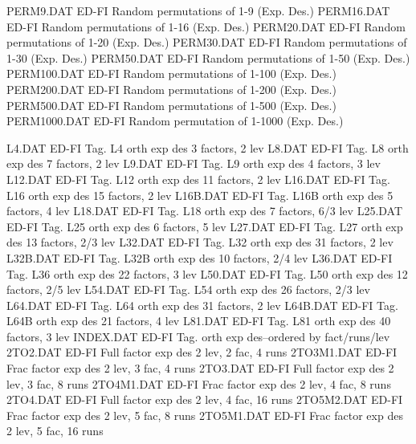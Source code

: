 PERM9.DAT                   ED-FI Random permutations of 1-9    (Exp. Des.)
PERM16.DAT                  ED-FI Random permutations of 1-16   (Exp. Des.)
PERM20.DAT                  ED-FI Random permutations of 1-20   (Exp. Des.)
PERM30.DAT                  ED-FI Random permutations of 1-30   (Exp. Des.)
PERM50.DAT                  ED-FI Random permutations of 1-50   (Exp. Des.)
PERM100.DAT                 ED-FI Random permutations of 1-100  (Exp. Des.)
PERM200.DAT                 ED-FI Random permutations of 1-200  (Exp. Des.)
PERM500.DAT                 ED-FI Random permutations of 1-500  (Exp. Des.)
PERM1000.DAT                ED-FI Random permutation  of 1-1000 (Exp. Des.)

L4.DAT                      ED-FI Tag. L4   orth exp des  3 factors,   2 lev
L8.DAT                      ED-FI Tag. L8   orth exp des  7 factors,   2 lev
L9.DAT                      ED-FI Tag. L9   orth exp des  4 factors,   3 lev
L12.DAT                     ED-FI Tag. L12  orth exp des 11 factors,   2 lev
L16.DAT                     ED-FI Tag. L16  orth exp des 15 factors,   2 lev
L16B.DAT                    ED-FI Tag. L16B orth exp des  5 factors,   4 lev
L18.DAT                     ED-FI Tag. L18  orth exp des  7 factors, 6/3 lev
L25.DAT                     ED-FI Tag. L25  orth exp des  6 factors,   5 lev
L27.DAT                     ED-FI Tag. L27  orth exp des 13 factors, 2/3 lev
L32.DAT                     ED-FI Tag. L32  orth exp des 31 factors,   2 lev
L32B.DAT                    ED-FI Tag. L32B orth exp des 10 factors, 2/4 lev
L36.DAT                     ED-FI Tag. L36  orth exp des 22 factors,   3 lev
L50.DAT                     ED-FI Tag. L50  orth exp des 12 factors, 2/5 lev
L54.DAT                     ED-FI Tag. L54  orth exp des 26 factors, 2/3 lev
L64.DAT                     ED-FI Tag. L64  orth exp des 31 factors,   2 lev
L64B.DAT                    ED-FI Tag. L64B orth exp des 21 factors,   4 lev
L81.DAT                     ED-FI Tag. L81  orth exp des 40 factors,   3 lev
INDEX.DAT                   ED-FI Tag. orth exp des--ordered by fact/runs/lev
2TO2.DAT                    ED-FI Full factor exp des 2 lev,  2 fac,   4 runs
2TO3M1.DAT                  ED-FI Frac factor exp des 2 lev,  3 fac,   4 runs
2TO3.DAT                    ED-FI Full factor exp des 2 lev,  3 fac,   8 runs
2TO4M1.DAT                  ED-FI Frac factor exp des 2 lev,  4 fac,   8 runs
2TO4.DAT                    ED-FI Full factor exp des 2 lev,  4 fac,  16 runs
2TO5M2.DAT                  ED-FI Frac factor exp des 2 lev,  5 fac,   8 runs
2TO5M1.DAT                  ED-FI Frac factor exp des 2 lev,  5 fac,  16 runs

